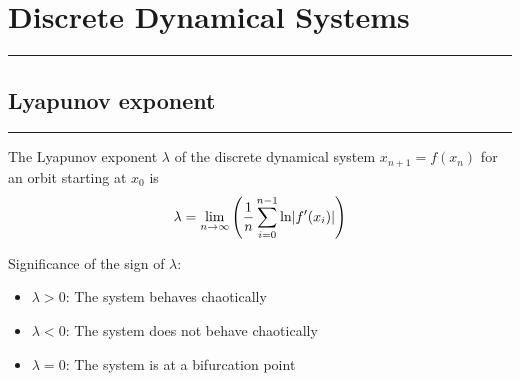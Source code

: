 \section{Discrete Dynamical Systems}
\noindent\rule[\linienAbstand]{\linewidth}{\linienDickeDick}

\subsection{Lyapunov exponent}
\noindent\rule[\linienAbstand]{\linewidth}{\linienDicke}
The Lyapunov exponent $\lambda$ of the discrete dynamical system $x_{n+1} = f(x_n)$ for an orbit starting at $x_0$ is
\begin{equation}
  \lambda = \lim_{n \to \infty}\left(\frac{1}{n} \sum_{i=0}^{n-1} \textup{ln}|f'(x_i)|\right)
\end{equation}

Significance of the sign of $\lambda$:
\begin{itemize}
  \item $\lambda > 0$: The system behaves chaotically
  \item $\lambda < 0$: The system does not behave chaotically
  \item $\lambda = 0$: The system is at a bifurcation point
\end{itemize}
